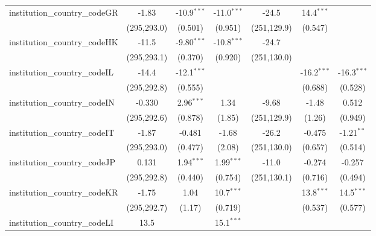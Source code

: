 \begin{tabular}{lcccccc}
   institution\_country\_codeGR          & -1.83         & -10.9$^{***}$ & -11.0$^{***}$ & -24.5         & 14.4$^{***}$  &   \\   
                                         & (295,293.0)   & (0.501)       & (0.951)       & (251,129.9)   & (0.547)       &   \\   
   institution\_country\_codeHK          & -11.5         & -9.80$^{***}$ & -10.8$^{***}$ & -24.7         &               &   \\   
                                         & (295,293.1)   & (0.370)       & (0.920)       & (251,130.0)   &               &   \\   
   institution\_country\_codeIL          & -14.4         & -12.1$^{***}$ &               &               & -16.2$^{***}$ & -16.3$^{***}$\\   
                                         & (295,292.8)   & (0.555)       &               &               & (0.688)       & (0.528)\\   
   institution\_country\_codeIN          & -0.330        & 2.96$^{***}$  & 1.34          & -9.68         & -1.48         & 0.512\\   
                                         & (295,292.6)   & (0.878)       & (1.85)        & (251,129.9)   & (1.26)        & (0.949)\\   
   institution\_country\_codeIT          & -1.87         & -0.481        & -1.68         & -26.2         & -0.475        & -1.21$^{**}$\\   
                                         & (295,293.0)   & (0.477)       & (2.08)        & (251,130.0)   & (0.657)       & (0.514)\\   
   institution\_country\_codeJP          & 0.131         & 1.94$^{***}$  & 1.99$^{***}$  & -11.0         & -0.274        & -0.257\\   
                                         & (295,292.8)   & (0.440)       & (0.754)       & (251,130.1)   & (0.716)       & (0.494)\\   
   institution\_country\_codeKR          & -1.75         & 1.04          & 10.7$^{***}$  &               & 13.8$^{***}$  & 14.5$^{***}$\\   
                                         & (295,292.7)   & (1.17)        & (0.719)       &               & (0.537)       & (0.577)\\   
   institution\_country\_codeLI          & 13.5          &               & 15.1$^{***}$  &               &               &   \\   

\end{tabular}
